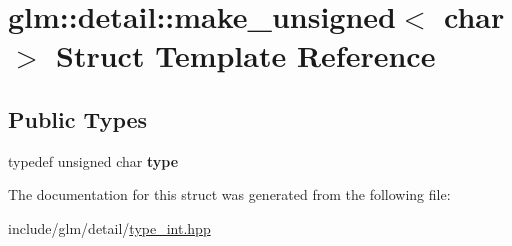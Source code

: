\hypertarget{structglm_1_1detail_1_1make__unsigned_3_01char_01_4}{}\section{glm\+:\+:detail\+:\+:make\+\_\+unsigned$<$ char $>$ Struct Template Reference}
\label{structglm_1_1detail_1_1make__unsigned_3_01char_01_4}
\subsection*{Public Types}
\begin{DoxyCompactItemize}
\item 
\mbox{\label{structglm_1_1detail_1_1make__unsigned_3_01char_01_4_a473f89289be25f14bdc7c459e4be4fed}} 
typedef unsigned char {\bfseries type}
\end{DoxyCompactItemize}


The documentation for this struct was generated from the following file\+:\begin{DoxyCompactItemize}
\item 
include/glm/detail/\hyperlink{type__int_8hpp}{type\+\_\+int.\+hpp}\end{DoxyCompactItemize}

